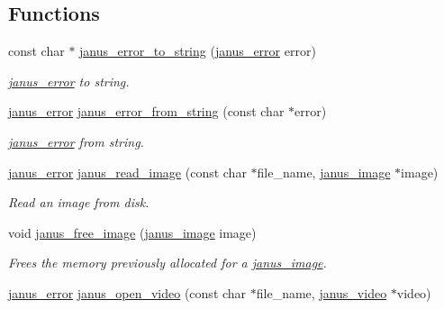 \subsection*{Functions}
\begin{DoxyCompactItemize}
\item 
const char $\ast$ \hyperlink{group__janus__io_ga0f8d56ae7315e5d340bdc2755ee11a61}{janus\+\_\+error\+\_\+to\+\_\+string} (\hyperlink{group__janus_ga1b275e4dade484951b366f785597b8f6}{janus\+\_\+error} error)
\begin{DoxyCompactList}\small\item\em \hyperlink{group__janus_ga8d1da4647fdb996401e33bc8c40ea773}{janus\+\_\+error} to string. \end{DoxyCompactList}\item 
\hyperlink{group__janus_ga1b275e4dade484951b366f785597b8f6}{janus\+\_\+error} \hyperlink{group__janus__io_ga664d28544441c4d0e5cf643e329a21c7}{janus\+\_\+error\+\_\+from\+\_\+string} (const char $\ast$error)
\begin{DoxyCompactList}\small\item\em \hyperlink{group__janus_ga8d1da4647fdb996401e33bc8c40ea773}{janus\+\_\+error} from string. \end{DoxyCompactList}\item 
\hyperlink{group__janus_ga1b275e4dade484951b366f785597b8f6}{janus\+\_\+error} \hyperlink{group__janus__io_ga57362724b9d4cbc15419d1b78107013e}{janus\+\_\+read\+\_\+image} (const char $\ast$file\+\_\+name, \hyperlink{structjanus__image}{janus\+\_\+image} $\ast$image)
\begin{DoxyCompactList}\small\item\em Read an image from disk. \end{DoxyCompactList}\item 
void \hyperlink{group__janus__io_ga4357d4fff5a8cb7abee595894a219b9d}{janus\+\_\+free\+\_\+image} (\hyperlink{structjanus__image}{janus\+\_\+image} image)
\begin{DoxyCompactList}\small\item\em Frees the memory previously allocated for a \hyperlink{structjanus__image}{janus\+\_\+image}. \end{DoxyCompactList}\item 
\hyperlink{group__janus_ga1b275e4dade484951b366f785597b8f6}{janus\+\_\+error} \hyperlink{group__janus__io_ga8063198a80f9dcb19bbd736c98c1a238}{janus\+\_\+open\+\_\+video} (const char $\ast$file\+\_\+name, \hyperlink{group__janus__io_gab8d7aec0b23d9584154fba8594845022}{janus\+\_\+video} $\ast$video)

\end{DoxyCompactItemize}

